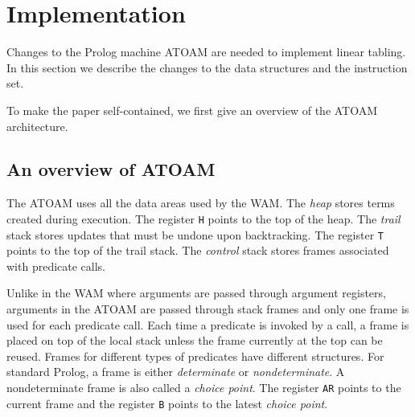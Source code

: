 \documentclass{tlp}
\newcommand{\ignore}[1]{}
\begin{document}
\section{Implementation}
Changes to the Prolog machine ATOAM \cite{Zhou96}  are needed to implement linear tabling. In this section we describe the changes to the data structures and the instruction set. 
\ignore{We also show how to implement the cut operator. }
To make the paper self-contained, we first give an overview of the ATOAM architecture. 

\subsection{An overview of ATOAM}
The ATOAM uses all the data areas used by the WAM. The {\it heap} stores terms created during execution. The register {\tt H} points to the top of the heap. The {\it trail} stack stores updates that must be undone upon backtracking. The register {\tt T} points to the top of the trail stack. The {\it control} stack stores frames associated with predicate calls. 

Unlike in the WAM where arguments are passed through argument registers, arguments in the ATOAM are passed through stack frames and only one frame is used for each predicate call. Each time a predicate is invoked by a call, a frame is placed on top of the local stack unless the frame currently at the top can be reused. Frames for different types of predicates have different structures. For standard Prolog, a frame is either {\it determinate} or {\it nondeterminate}. A nondeterminate frame is also called a {\it choice point}. The register {\tt AR} points to the current frame and the register {\tt B} points to the latest {\it choice point}.
\end{document}
